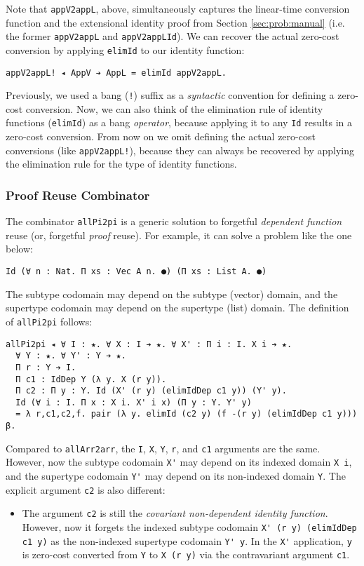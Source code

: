 \documentclass[acmsmall]{acmart}\settopmatter{}
\newcommand{\refsec}[1]{Section \ref{sec:#1}}
\begin{document}
Note that \verb;appV2appL;, above, simultaneously captures the
linear-time conversion function and the extensional identity proof
from \refsec{prob:manual}
(i.e. the former \verb;appV2appL; and \verb;appV2appLId;).
We can recover the actual zero-cost
conversion by applying \verb;elimId; to our identity function:
\begin{verbatim}
appV2appL! ◂ AppV ➔ AppL = elimId appV2appL.
\end{verbatim}
Previously, we used a bang (\verb;!;) suffix as a \textit{syntactic} convention for
defining a zero-cost conversion. Now, we can also think of the elimination
rule of identity functions (\verb;elimId;) as a bang
\textit{operator}, because applying it to any \verb;Id; results in a
zero-cost conversion. From now on we omit defining the actual
zero-cost conversions (like \verb;appV2appL!;), because they can always
be recovered by applying the elimination rule for the type of identity
functions.

\subsubsection{Proof Reuse Combinator}

The combinator \verb;allPi2pi; is a generic solution to forgetful
\textit{dependent function} reuse (or, forgetful \textit{proof} reuse). For
example, it can solve a problem like the one below:
\begin{verbatim}
Id (∀ n : Nat. Π xs : Vec A n. ●) (Π xs : List A. ●)
\end{verbatim}
The subtype codomain may depend on the subtype (vector) domain, and
the supertype codomain may depend on the supertype (list) domain.
The definition of \verb;allPi2pi; follows:
\begin{verbatim}
allPi2pi ◂ ∀ I : ★. ∀ X : I ➔ ★. ∀ X' : Π i : I. X i ➔ ★. 
  ∀ Y : ★. ∀ Y' : Y ➔ ★.
  Π r : Y ➔ I.
  Π c1 : IdDep Y (λ y. X (r y)).
  Π c2 : Π y : Y. Id (X' (r y) (elimIdDep c1 y)) (Y' y).
  Id (∀ i : I. Π x : X i. X' i x) (Π y : Y. Y' y)
  = λ r,c1,c2,f. pair (λ y. elimId (c2 y) (f -(r y) (elimIdDep c1 y))) β.
\end{verbatim}
Compared to \verb;allArr2arr;, the \verb;I;, \verb;X;, \verb;Y;,
\verb;r;, and \verb;c1; arguments are the same. However, now the
subtype codomain \verb;X'; may depend on its indexed domain
\verb;X i;, and the supertype codomain \verb;Y'; may depend on its
non-indexed domain \verb;Y;. The explicit argument \verb;c2; is also
different:

\begin{itemize}
\item The argument \verb;c2; is still the \textit{covariant
  non-dependent identity function}. However, now it forgets the
  indexed subtype codomain \verb;X' (r y) (elimIdDep c1 y); as the
  non-indexed supertype codomain \verb;Y' y;. In the \verb;X';
  application, \verb;y; is zero-cost converted from \verb;Y; to
  \verb;X (r y); via the contravariant argument \verb;c1;.
\end{itemize}
\end{document}
